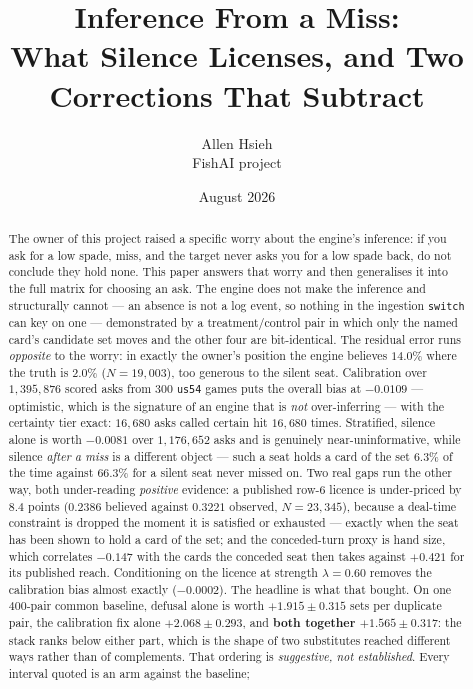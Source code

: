 \documentclass[11pt]{article}
\title{Inference From a Miss:\\ What Silence Licenses, and Two Corrections That Subtract}
\author{Allen Hsieh\\[2pt] {\small FishAI project}}
\date{August 2026}
\newcommand{\code}[1]{\texttt{#1}}
\newcommand{\usff}{\code{us54}}
\begin{document}
\maketitle

\begin{abstract}
\noindent
The owner of this project raised a specific worry about the engine's inference: if you
ask for a low spade, miss, and the target never asks you for a low spade back, do not
conclude they hold none. This paper answers that worry and then generalises it into the
full matrix for choosing an ask. The engine does not make the inference and structurally
cannot --- an absence is not a log event, so nothing in the ingestion \code{switch} can
key on one --- demonstrated by a treatment/control pair in which only the named card's
candidate set moves and the other four are bit-identical. The residual error runs
\emph{opposite} to the worry: in exactly the owner's position the engine believes
$14.0\%$ where the truth is $2.0\%$ ($N = 19{,}003$), too generous to the silent seat.
Calibration over $1{,}395{,}876$ scored asks from $300$ \usff{} games puts the overall
bias at $-0.0109$ --- optimistic, which is the signature of an engine that is \emph{not}
over-inferring --- with the certainty tier exact: $16{,}680$ asks called certain hit
$16{,}680$ times. Stratified, silence alone is worth $-0.0081$ over $1{,}176{,}652$ asks
and is genuinely near-uninformative, while silence \emph{after a miss} is a different
object --- such a seat holds a card of the set $6.3\%$ of the time against $66.3\%$ for a
silent seat never missed on. Two real gaps run the other way, both under-reading
\emph{positive} evidence: a published row-6 licence is under-priced by $8.4$ points
($0.2386$ believed against $0.3221$ observed, $N = 23{,}345$), because a deal-time
constraint is dropped the moment it is satisfied or exhausted --- exactly when the seat
has been shown to hold a card of the set; and the conceded-turn proxy is hand size, which
correlates $-0.147$ with the cards the conceded seat then takes against $+0.421$ for its
published reach. Conditioning on the licence at strength $\lambda = 0.60$ removes the
calibration bias almost exactly ($-0.0002$). The headline is what that bought. On one
$400$-pair common baseline, defusal alone is worth $+1.915 \pm 0.315$ sets per duplicate
pair, the calibration fix alone $+2.068 \pm 0.293$, and \textbf{both together
$+1.565 \pm 0.317$}: the stack ranks below either part, which is the shape of two
substitutes reached different ways rather than of complements. That ordering is
\emph{suggestive, not established}. Every interval quoted is an arm against the baseline;

\end{abstract}
\end{document}
